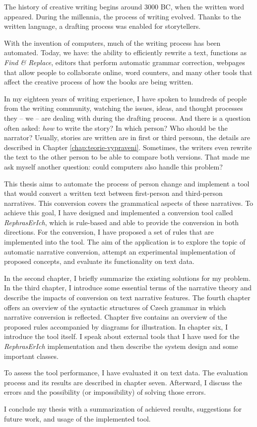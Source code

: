 The history of creative writing begins around 3000 BC, when the written word appeared. During the millennia, the process of writing evolved. Thanks to the written language, a drafting process was enabled for storytellers.

With the invention of computers, much of the writing process has been automated. Today, we have: the ability to efficiently rewrite a text, functions as \emph{Find \& Replace}, editors that perform automatic grammar correction, webpages that allow people to collaborate online, word counters, and many other tools that affect the creative process of how the books are being written.

In my eighteen years of writing experience, I have spoken to hundreds of people from the writing community, watching the issues, ideas, and thought processes they -- we -- are dealing with during the drafting process. And there is a question often asked: \emph{how} to write the story? In which person? Who should be the narrator? Usually, stories are written are in first or third personn, the details are described in Chapter \ref{chap:teorie-vypraveni}. Sometimes, the writers even rewrite the text to the other person to be able to compare both versions. That made me ask myself another question: could computers also handle this problem?

This thesis aims to automate the process of person change and implement a tool that would convert a written text between first-person and third-person narratives. This conversion covers the grammatical aspects of these narratives. To achieve this goal, I have designed and implemented a conversion tool called \emph{RephrasErIch}, which is rule-based and able to provide the conversion in both directions. For the conversion, I have proposed a set of rules that are implemented into the tool. The aim of the application is to explore the topic of automatic narrative conversion, attempt an experimental implementation of proposed concepts, and evaluate its functionality on text data.

In the second chapter, I briefly summarize the existing solutions for my problem. In the third chapter, I introduce some essential terms of the narrative theory and describe the impacts of conversion on text narrative features. The fourth chapter offers an overview of the syntactic structures of Czech grammar in which narrative conversion is reflected. Chapter five contains an overview of the proposed rules accompanied by diagrams for illustration. In chapter six, I introduce the tool itself. I speak about external tools that I have used for the \emph{RephrasErIch} implementation and then describe the system design and some important classes.

To assess the tool performance, I have evaluated it on text data. The evaluation process and its results are described in chapter seven. Afterward, I discuss the errors and the possibility (or impossibility) of solving those errors.

I conclude my thesis with a summarization of achieved results, suggestions for future work, and usage of the implemented tool.

